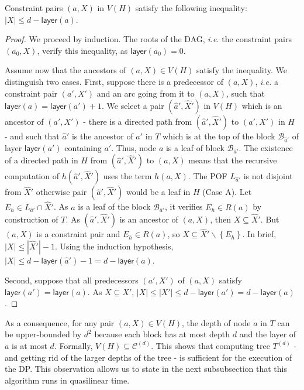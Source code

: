 \documentclass[a4paper,UKenglish,numberwithinsect,cleveref, autoref,anonymous]{lipics-v2021}
\newcommand{\set}[1]{\left\{ #1 \right\}}
\newcommand{\card}[1]{\left| #1 \right|}
\begin{document}
\begin{lemma}
Constraint pairs $(a,X)$ in $V(H)$ satisfy the following inequality: $\card{X}\le d-\textsf{layer}(a)$.
\label{le:layer_inequality}
\end{lemma}
\begin{proof}
We proceed by induction. The roots of the DAG, {\em i.e.} the constraint pairs $(a_0,X)$, verify this inequality, as $\textsf{layer}(a_0) = 0$. 

Assume now that the ancestors of $(a,X) \in V(H)$ satisfy the inequality. We distinguish two cases. First, suppose there is a predecessor of $(a,X)$, {\em i.e.} a constraint pair $(a',X')$ and an arc going from it to $(a,X)$, such that $\textsf{layer}(a) = \textsf{layer}(a')+1$. We select a pair $(\widehat{a}',\widehat{X}')$ in $V(H)$ which is an ancestor of $(a',X')$ - there is a directed path from  $(\widehat{a}',\widehat{X}')$ to $(a',X')$ in $H$ - and such that $\widehat{a}'$ is the ancestor of $a'$ in $T$ which is at the top of the block $\mathcal{B}_{\widehat{a}'}$ of layer $\textsf{layer}(a')$ containing $a'$. Thus, node $a$ is a leaf of block $\mathcal{B}_{\widehat{a}'}$. The existence of a directed path in $H$ from $(\widehat{a}',\widehat{X}')$ to $(a,X)$ means that the recursive computation of $h(\widehat{a}',\widehat{X}')$ uses the term $h(a,X)$. The POF $L_{\widehat{a}'}$ is not disjoint from $\widehat{X}'$ otherwise pair $(\widehat{a}',\widehat{X}')$ would be a leaf in $H$ (Case A). Let $E_h \in L_{\widehat{a}'} \cap \widehat{X}'$. As $a$ is a leaf of the block $\mathcal{B}_{\widehat{a}'}$, it verifies $E_h \in R(a)$ by construction of $T$. As $(\widehat{a}',\widehat{X}')$ is an ancestor of $(a,X)$, then $X \subseteq \widehat{X}'$. But $(a,X)$ is a constraint pair and $E_h \in R(a)$, so $X \subseteq \widehat{X}'\backslash \set{E_h}$. In brief, $\card{X} \le \card{\widehat{X}'} - 1$. Using the induction hypothesis, $\card{X} \le d-\textsf{layer}(\widehat{a}')-1 = d-\textsf{layer}(a)$.

Second, suppose that all predecessors $(a',X')$ of $(a,X)$ satisfy $\textsf{layer}(a') = \textsf{layer}(a)$. As $X \subseteq X'$, $\card{X}\le \card{X'} \le d-\textsf{layer}(a') = d-\textsf{layer}(a)$. 
\end{proof}

As a consequence, for any pair $(a,X) \in V(H)$, the depth of node $a$ in $T$ can be upper-bounded by $d^2$ because each block has at most depth $d$ and the layer of $a$ is at most $d$. Formally, $V(H) \subseteq \mathcal{C}^{(d)}$. This shows that computing tree $T^{(d)}$ - and getting rid of the larger depths of the tree - is sufficient for the execution of the DP. This observation allows us to state in the next subsubsection that this algorithm runs in quasilinear time.
\end{document}
